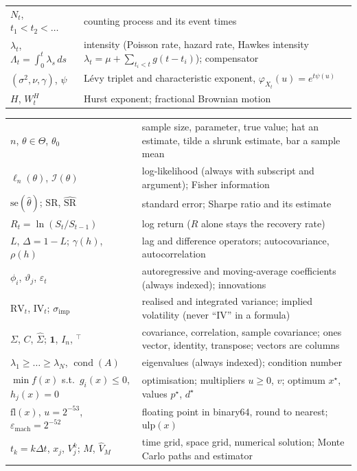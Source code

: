 \begin{notation}
{\begin{tabular}{@{}p{4.3cm}p{9.7cm}@{}}
$N_t$, $t_1 < t_2 < \dots$ & counting process and its event times \\
$\lambda_t$, $\Lambda_t = \int_0^t\lambda_s\,ds$ & intensity (Poisson rate, hazard rate, Hawkes intensity $\lambda_t = \mu + \sum_{t_i < t}g(t - t_i)$); compensator \\
$(\sigma^2, \nu, \gamma)$, $\psi$ & Lévy triplet and characteristic exponent, $\varphi_{X_t}(u) = e^{t\psi(u)}$ \\
$H$, $W^H_t$ & Hurst exponent; fractional Brownian motion \\
\bottomrule
\end{tabular}}
\end{notation}

\begin{notation}\label{not:qm:probability-at-speed:stat}
\leavevmode\par\smallskip\noindent
{\small
\begin{tabular}{@{}p{4.3cm}p{9.7cm}@{}}
\toprule
$n$, $\theta \in \Theta$, $\theta_0$ & sample size, parameter, true value; hat an estimate, tilde a shrunk estimate, bar a sample mean \\
$\ell_n(\theta)$, $\mathcal I(\theta)$ & log-likelihood (always with subscript and argument); Fisher information \\
$\mathrm{se}(\hat\theta)$; $\mathrm{SR}$, $\widehat{\mathrm{SR}}$ & standard error; Sharpe ratio and its estimate \\
$R_t = \ln(S_t/S_{t-1})$ & log return ($R$ alone stays the recovery rate) \\
$L$, $\Delta = 1 - L$; $\gamma(h)$, $\rho(h)$ & lag and difference operators; autocovariance, autocorrelation \\
$\phi_i$, $\vartheta_j$, $\varepsilon_t$ & autoregressive and moving-average coefficients (always indexed); innovations \\
$\mathrm{RV}_t$, $\mathrm{IV}_t$; $\sigma_{\mathrm{imp}}$ & realised and integrated variance; implied volatility (never ``IV'' in a formula) \\
$\Sigma$, $C$, $\hat\Sigma$; $\mathbf 1$, $I_n$, ${}^\top$ & covariance, correlation, sample covariance; ones vector, identity, transpose; vectors are columns \\
$\lambda_1 \ge \dots \ge \lambda_N$, $\operatorname{cond}(A)$ & eigenvalues (always indexed); condition number \\
$\min f(x)$ s.t.\ $g_i(x) \le 0$, $h_j(x) = 0$ & optimisation; multipliers $u \ge 0$, $v$; optimum $x^\star$, values $p^\star$, $d^\star$ \\
$\mathrm{fl}(x)$, $u = 2^{-53}$, $\varepsilon_{\mathrm{mach}} = 2^{-52}$ & floating point in binary64, round to nearest; $\mathrm{ulp}(x)$ \\
$t_k = k\Delta t$, $x_j$, $V^k_j$; $M$, $\hat V_M$ & time grid, space grid, numerical solution; Monte Carlo paths and estimator \\
\bottomrule
\end{tabular}}
\end{notation}

